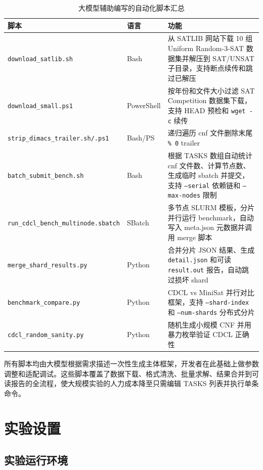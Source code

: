 \documentclass[12pt,a4paper]{article}
\begin{document}
\begin{table}[H]
\centering
\renewcommand{\arraystretch}{1.4}
\begin{tabular}{llp{8cm}}
\toprule
\textbf{脚本} & \textbf{语言} & \textbf{功能} \\
\midrule
\texttt{download\_satlib.sh} & Bash & 从 SATLIB 网站下载 10 组 Uniform Random-3-SAT 数据集并解压到 SAT/UNSAT 子目录，支持断点续传和跳过已解压 \\
\texttt{download\_small.ps1} & PowerShell & 按年份和文件大小过滤 SAT Competition 数据集下载，支持 HEAD 预检和 \texttt{wget -c} 续传 \\
\texttt{strip\_dimacs\_trailer.sh/.ps1} & Bash/PS & 递归遍历 cnf 文件删除末尾 \texttt{\% 0} trailer \\
\texttt{batch\_submit\_bench.sh} & Bash & 根据 TASKS 数组自动统计 cnf 文件数、计算节点数、生成临时 sbatch 并提交，支持 \texttt{--serial} 依赖链和 \texttt{--max-nodes} 限制 \\
\texttt{run\_cdcl\_bench\_multinode.sbatch} & SBatch & 多节点 SLURM 模板，分片并行运行 benchmark，自动写入 meta.json 元数据并调用 merge 脚本 \\
\texttt{merge\_shard\_results.py} & Python & 合并分片 JSON 结果、生成 \texttt{detail.json} 和可读 \texttt{result.out} 报告，自动跳过损坏 shard \\
\texttt{benchmark\_compare.py} & Python & CDCL vs MiniSat 并行对比框架，支持 \texttt{--shard-index} 和 \texttt{--num-shards} 分布式分片 \\
\texttt{cdcl\_random\_sanity.py} & Python & 随机生成小规模 CNF 并用暴力枚举验证 CDCL 正确性 \\
\bottomrule
\end{tabular}
\caption{大模型辅助编写的自动化脚本汇总}
\label{tab:ai_scripts}
\end{table}

所有脚本均由大模型根据需求描述一次性生成主体框架，开发者在此基础上做参数调整和适配调试。这些脚本覆盖了数据下载、格式清洗、批量求解、结果合并到可读报告的全流程，使大规模实验的人力成本降至只需编辑 TASKS 列表并执行单条命令。

\section{实验设置}

\subsection{实验运行环境}
\end{document}
